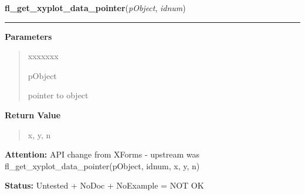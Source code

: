 \hspace{.8\funcindent}\begin{boxedminipage}{\funcwidth}

    \raggedright \textbf{fl\_get\_xyplot\_data\_pointer}(\textit{pObject}, \textit{idnum})

    \vspace{-1.5ex}

    \rule{\textwidth}{0.5\fboxrule}
\setlength{\parskip}{2ex}
\setlength{\parskip}{1ex}
      \textbf{Parameters}
      \vspace{-1ex}

      \begin{quote}
        \begin{Ventry}{xxxxxxx}

          \item[pObject]

          pointer to object

        \end{Ventry}

      \end{quote}

      \textbf{Return Value}
    \vspace{-1ex}

      \begin{quote}
      x, y, n

      \end{quote}

\textbf{Attention:} API change from XForms - upstream was 
fl\_get\_xyplot\_data\_pointer(pObject, idnum, x, y, n)



\textbf{Status:} Untested + NoDoc + NoExample = NOT OK



    \end{boxedminipage}

    \label{xformslib:library:fl_get_xyplot_overlay_data}

    \vspace{0.5ex}

